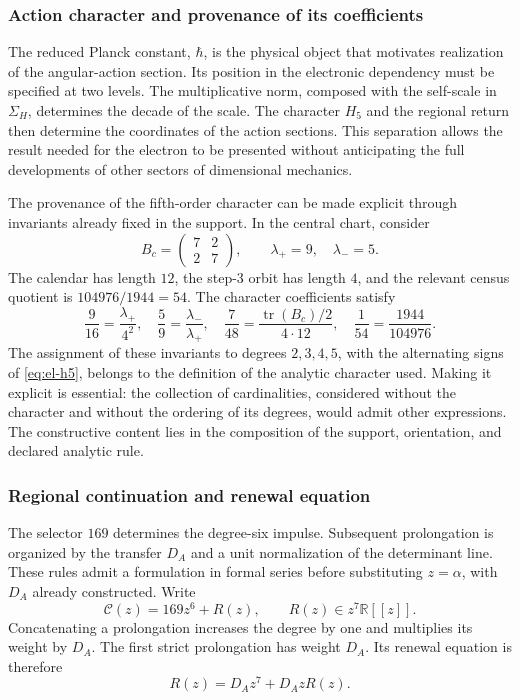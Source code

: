 \subsubsection{Action character and provenance of its coefficients}
\label{sec:revision-planck}

The reduced Planck constant, \(\hbar\), is the physical object
that motivates realization of the angular-action section. Its position in
the electronic dependency must be specified at two levels. The multiplicative
norm, composed with the self-scale in \(\Sigma_H\), determines the decade of the scale. The character
\(H_5\) and the regional return then determine the coordinates of the
action sections. This separation allows the result needed
for the electron to be presented without anticipating the full developments of
other sectors of dimensional mechanics.

The provenance of the fifth-order character can be made explicit through
invariants already fixed in the support. In the central chart, consider
\[
 B_c=\begin{pmatrix}7&2\\2&7\end{pmatrix},
 \qquad \lambda_+=9,\quad\lambda_-=5.
\]
The calendar has length \(12\), the step-\(3\) orbit has
length \(4\), and the relevant census quotient is
\(104976/1944=54\). The character coefficients satisfy
\begin{equation}
 \frac9{16}=\frac{\lambda_+}{4^2},\quad
 \frac59=\frac{\lambda_-}{\lambda_+},\quad
 \frac7{48}=\frac{\operatorname{tr}(B_c)/2}{4\cdot12},\quad
 \frac1{54}=\frac{1944}{104976}.
 \label{eq:revision-h5-coeficientes}
\end{equation}
The assignment of these invariants to degrees \(2,3,4,5\), with the
alternating signs of \eqref{eq:el-h5}, belongs to the definition of the
analytic character used. Making it explicit is essential: the collection of
cardinalities, considered without the character and without the ordering of its degrees,
would admit other expressions. The constructive content lies in the
composition of the support, orientation, and declared analytic rule.

\subsubsection{Regional continuation and renewal equation}

The selector \(169\) determines the degree-six impulse. Subsequent
prolongation is organized by the transfer \(D_A\) and a unit
normalization of the determinant line. These rules admit a formulation
in formal series before substituting \(z=\alpha\), with \(D_A\) already
constructed. Write
\[
 \mathscr C(z)=169z^6+R(z),\qquad R(z)\in z^7\mathbb R[[z]].
\]
Concatenating a prolongation increases the degree by one and
multiplies its weight by \(D_A\). The first strict prolongation has
weight \(D_A\). Its renewal equation is therefore
\begin{equation}
 R(z)=D_Az^7+D_AzR(z).
 \label{eq:revision-renovacion}
\end{equation}

